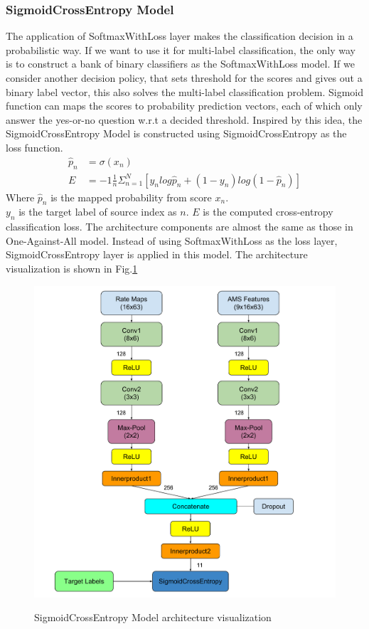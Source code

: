 \subsubsection{SigmoidCrossEntropy Model}
The application of SoftmaxWithLoss layer makes the classification decision in a probabilistic way. If we want to use it for multi-label classification, the only way is to construct a bank of binary classifiers as the SoftmaxWithLoss model. If we consider another decision policy, that sets threshold for the scores and gives out a binary label vector, this also solves the multi-label classification problem. Sigmoid function can maps the scores to probability prediction vectors, each of which only answer the yes-or-no question w.r.t a decided threshold. Inspired by this idea, the SigmoidCrossEntropy Model is constructed using SigmoidCrossEntropy as the loss function. 
\begin{align}
\hat{p}_n &=\sigma(x_n) \\
E &= -1\frac{1}{n}\Sigma_{n=1}^{N}[y_nlog\hat{p}_n+(1-y_n)log(1-\hat{p}_n)]
\end{align}
Where $\hat{p}_{n}$ is the mapped probability from score $x_n$.\\
$y_n$ is the target label of source index as $n$.
$E$ is the computed cross-entropy classification loss. 
The architecture components are almost the same as those in One-Against-All model. Instead of using SoftmaxWithLoss as the loss layer, SigmoidCrossEntropy layer is applied in this model. The architecture visualization is shown in Fig.\ref{fig:sigmoidCE}
\begin{figure}[h!]
	\centering
	\includegraphics[scale=0.5]{../image/chapter2/Architecture3.pdf}
	\label{fig:sigmoidCE}
	\caption{SigmoidCrossEntropy Model architecture visualization}
\end{figure}
